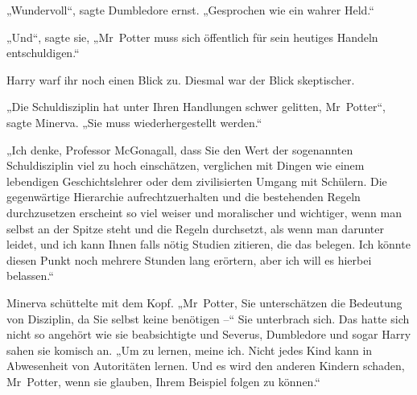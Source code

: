 „Wundervoll“, sagte Dumbledore ernst. „Gesprochen wie ein wahrer Held.“ 

„Und“, sagte sie, „Mr~Potter muss sich öffentlich für sein heutiges Handeln entschuldigen.“ 

Harry warf ihr noch einen Blick zu. Diesmal war der Blick skeptischer. 

„Die Schuldisziplin hat unter Ihren Handlungen schwer gelitten, Mr~Potter“, sagte Minerva. „Sie muss wiederhergestellt werden.“ 

„Ich denke, Professor McGonagall, dass Sie den Wert der sogenannten Schuldisziplin viel zu hoch einschätzen, verglichen mit Dingen wie einem lebendigen Geschichtslehrer oder dem zivilisierten Umgang mit Schülern. Die gegenwärtige Hierarchie aufrechtzuerhalten und die bestehenden Regeln durchzusetzen erscheint so viel weiser und moralischer und wichtiger, wenn man selbst an der Spitze steht und die Regeln durchsetzt, als wenn man darunter leidet, und ich kann Ihnen falls nötig Studien zitieren, die das belegen. Ich könnte diesen Punkt noch mehrere Stunden lang erörtern, aber ich will es hierbei belassen.“ 

Minerva schüttelte mit dem Kopf. „Mr~Potter, Sie unterschätzen die Bedeutung von Disziplin, da Sie selbst keine benötigen –“ Sie unterbrach sich. Das hatte sich nicht so angehört wie sie beabsichtigte und Severus, Dumbledore und sogar Harry sahen sie komisch an. „Um zu lernen, meine ich. Nicht jedes Kind kann in Abwesenheit von Autoritäten lernen. Und es wird den anderen Kindern schaden, Mr~Potter, wenn sie glauben, Ihrem Beispiel folgen zu können.“ 

